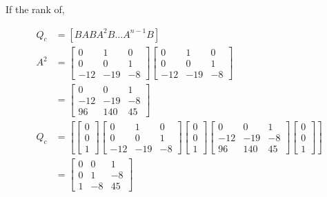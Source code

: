 \documentclass[main.tex]{subfiles}
\begin{document}
\begin{enumerate}
\begin{enumerate}
        If the rank of,
        
        $$
        \begin{aligned}  
        Q_c &= \left[B A B A^2 B \ldots A^{n-1} B\right]\\
        A^2 & = \left[\begin{array}{ccc}
        0 & 1 & 0 \\
        0 & 0 & 1 \\
        -12 & -19 & -8
        \end{array}\right] \left[\begin{array}{ccc}
        0 & 1 & 0 \\
        0 & 0 & 1 \\
        -12 & -19 & -8
        \end{array}\right] \\
        & = \left[\begin{array}{ccc}
        0 & 0 & 1 \\
        -12 & -19 & -8 \\
        96 & 140 & 45
        \end{array}\right]\\
        Q_c &= \left[\left[\begin{array}{l}
        0 \\
        0 \\
        1
        \end{array}\right] \left[\begin{array}{ccc}
        0 & 1 & 0 \\
        0 & 0 & 1 \\
        -12 & -19 & -8
        \end{array}\right] \left[\begin{array}{l}
        0 \\
        0 \\
        1
        \end{array}\right] \left[\begin{array}{ccc}
        0 & 0 & 1 \\
        -12 & -19 & -8 \\
        96 & 140 & 45
        \end{array}\right] \left[\begin{array}{l}
        0 \\
        0 \\
        1
        \end{array}\right] \right]\\
        & = \left[\begin{array}{ccc}
        0 & 0 & 1 \\
        0 & 1 & -8 \\
        1 & -8 & 45
        \end{array}\right]
        \end{aligned}
        $$
        

\end{enumerate}
\end{enumerate}
\end{document}
